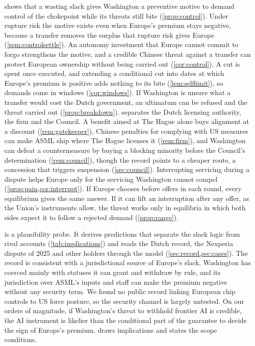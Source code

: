  shows that a wasting slack gives Washington a preventive motive to demand control of the chokepoint while its threats still bite (\cref{prop:control}). Under rupture risk the motive exists even when Europe's premium stays negative, because a transfer removes the surplus that rupture risk gives Europe (\cref{rem:controlsettle}). An autonomy investment that Europe cannot commit to forgo strengthens the motive, and a credible Chinese threat against a transfer can protect European ownership without being carried out (\cref{cor:control}). A cut is spent once executed, and extending a conditional cut into dates at which Europe's premium is positive adds nothing to its bite (\cref{lem:selflimit}), so demands come in windows (\cref{cor:windows}). If Washington is unsure what a transfer would cost the Dutch government, an ultimatum can be refused and the threat carried out (\cref{prop:breakdown}).  separates the Dutch licensing authority, the firm and the Council. A benefit aimed at The Hague alone buys alignment at a discount (\cref{rem:gatekeeper}), Chinese penalties for complying with US measures can make ASML ship where The Hague licenses it (\cref{rem:firm}), and Washington can defeat a countermeasure by buying a blocking minority before the Council's determination (\cref{rem:council}), though the record points to a cheaper route, a concession that triggers suspension (\cref{sec:council}). Interrupting servicing during a dispute helps Europe only for the servicing Washington cannot compel (\cref{prop:pain,cor:interrupt}). If Europe chooses before offers in each round, every equilibrium gives the same answer. If it can lift an interruption after any offer, as the Union's instruments allow, the threat works only in equilibria in which both sides expect it to follow a rejected demand (\cref{prop:range}).

 is a plausibility probe. It derives predictions that separate the slack logic from rival accounts (\cref{tab:implications}) and reads the Dutch record, the Nexperia dispute of 2025 and other holders through the model (\cref{sec:record,sec:cases}). The record is consistent with a jurisdictional source of Europe's slack. Washington has coerced mainly with statuses it can grant and withdraw by rule, and its jurisdiction over ASML's inputs and staff can make the premium negative without any security term. We found no public record linking European chip controls to US force posture, so the security channel is largely untested. On our orders of magnitude, if Washington's threat to withhold frontier AI is credible, the AI instrument is likelier than the conditional part of the guarantee to decide the sign of Europe's premium.  draws implications and states the scope conditions.

